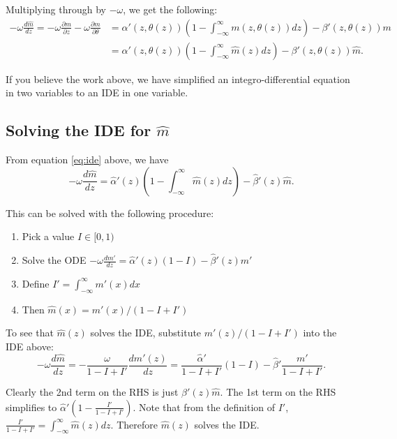 \documentclass{article}
\begin{document}
Multiplying through by $-\omega$, we get the following:
\begin{align}
  -\omega\frac{d\hat{m}}{dz} = -\omega \frac{\partial m}{\partial z} -
  \omega\frac{\partial m}{\partial\theta}
  &= \alpha'(z, \theta(z)) \left(1 - \int_{-\infty}^{\infty} m(z,
    \theta(z)) dz \right) - \beta'(z, \theta(z)) m \nonumber \\
  &= \alpha'(z, \theta(z)) \left(1 - \int_{-\infty}^{\infty}
    \hat{m}(z) dz \right) - \beta'(z, \theta(z))
    \hat{m}. \label{eq:ide}
\end{align}

If you believe the work above, we have simplified an
integro-differential equation in two variables to an IDE in one
variable.

\subsection{Solving the IDE for $\hat{m}$}
\label{sec:solving-ide}

From equation \eqref{eq:ide} above, we have
\begin{equation}
  -\omega\frac{d\hat{m}}{dz} = \hat{\alpha}'(z) \left(1 -
    \int_{-\infty}^{\infty} \hat{m}(z) dz \right) - \hat{\beta}'(z)
  \hat{m}.
\end{equation}

This can be solved with the following procedure:

\begin{enumerate}
\item Pick a value $I \in [0, 1)$
\item Solve the ODE $-\omega\frac{dm'}{dz} = \hat{\alpha}'(z) \left(1
    - I \right) - \hat{\beta}'(z) m'$ 
\item Define $I' = \int_{-\infty}^{\infty} m'(x) dx$ 
\item Then $\hat{m}(x) = m'(x)/(1 - I + I')$
\end{enumerate}

To see that $\hat{m}(z)$ solves the IDE, substitute $m'(z)/(1 - I +
I')$ into the IDE above:
\begin{equation}
  -\omega \frac{d\hat{m}}{dz} = -\frac{\omega}{1 - I +
    I'}\frac{dm'(z)}{dz} = \frac{\hat{\alpha}'}{1 - I + I'}(1 - I) -
  \hat{\beta}'\frac{m'}{1 - I + I'}. \label{eq:verify}
\end{equation}

Clearly the 2nd term on the RHS is just $\hat{\beta}'(z) \hat{m}$. The
1st term on the RHS simplifies to $\hat{\alpha}' \left(1 - \frac{I'}{1
    - I + I'}\right)$. Note that from the definition of $I'$,
$\frac{I'}{1 - I + I'} = \int_{-\infty}^{\infty} \hat{m}(z)
dz$. Therefore $\hat{m}(z)$ solves the IDE.
\end{document}

